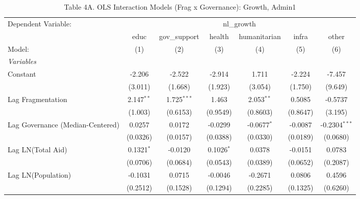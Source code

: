 \begin{table}[H]
   \caption{Table 4A. OLS Interaction Models (Frag x Governance): Growth, Admin1}
   \centering
   \begin{tabular}{lcccccc}
      \tabularnewline \midrule \midrule
      Dependent Variable: & \multicolumn{6}{c}{nl\_growth}\\
                                                           & educ          & gov\_support  & health       & humanitarian  & infra    & other \\   
      Model:                                               & (1)           & (2)           & (3)          & (4)           & (5)      & (6)\\  
      \midrule
      \emph{Variables}\\
      Constant                                             & -2.206        & -2.522        & -2.914       & 1.711         & -2.224   & -7.457\\   
                                                           & (3.011)       & (1.668)       & (1.923)      & (3.054)       & (1.750)  & (9.649)\\   
      Lag Fragmentation                                    & 2.147$^{**}$  & 1.725$^{***}$ & 1.463        & 2.053$^{**}$  & 0.5085   & -0.5737\\   
                                                           & (1.003)       & (0.6153)      & (0.9549)     & (0.8603)      & (0.8647) & (3.195)\\   
      Lag Governance (Median-Centered)                     & 0.0257        & 0.0172        & -0.0299      & -0.0677$^{*}$ & -0.0087  & -0.2304$^{***}$\\   
                                                           & (0.0326)      & (0.0157)      & (0.0388)     & (0.0330)      & (0.0189) & (0.0680)\\   
      Lag LN(Total Aid)                                    & 0.1321$^{*}$  & -0.0120       & 0.1026$^{*}$ & 0.0378        & -0.0151  & 0.0783\\   
                                                           & (0.0706)      & (0.0684)      & (0.0543)     & (0.0389)      & (0.0652) & (0.2087)\\   
      Lag LN(Population)                                   & -0.1031       & 0.0715        & -0.0046      & -0.2671       & 0.0806   & 0.4596\\   
                                                           & (0.2512)      & (0.1528)      & (0.1294)     & (0.2285)      & (0.1325) & (0.6260)\\   

\end{tabular}
\end{table}
